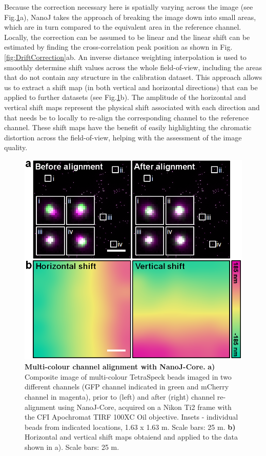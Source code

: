  Because the correction necessary here is spatially varying across the image (see Fig.\ref{fig:ChannelAlignment}a), NanoJ takes the approach of breaking the image down into small areas, which are in turn compared to the equivalent area in the reference channel. Locally, the correction can be assumed to be linear and the linear shift can be estimated by finding the cross-correlation peak position as shown in Fig.\ref{fig:DriftCorrection}ab. An inverse distance weighting interpolation \cite{shepard1968two} is used to smoothly determine shift values across the whole field-of-view, including the areas that do not contain any structure in the calibration dataset. This approach allows us to extract a shift map (in both vertical and horizontal directions) that can be applied to further datasets (see Fig.\ref{fig:ChannelAlignment}b). The amplitude of the horizontal and vertical shift maps represent the physical shift associated with each direction and that needs be to locally to re-align the corresponding channel to the reference channel. These shift maps have the benefit of easily highlighting the chromatic distortion across the field-of-view, helping with the assessment of the image quality. 
 
 \begin{figure}[!t]
    \centering
    \includegraphics[width=\linewidth]{Figures/Test_Figure_3.png}
    \caption{\textbf{Multi-colour channel alignment with NanoJ-Core.} \textbf{a)} Composite image of multi-colour TetraSpeck beads imaged in two different channels (GFP channel indicated in green and mCherry channel in magenta), prior to (left) and after (right) channel re-alignment using NanoJ-Core, acquired on a Nikon Ti2 frame with the CFI Apochromat TIRF 100XC Oil objective. Insets - individual beads from indicated locations, 1.63 x 1.63 \micro m. Scale bars: 25 \micro m. \textbf{b)} Horizontal and vertical shift maps obtaiend and applied to the data shown in a). Scale bars: 25 \micro m.}
    \label{fig:ChannelAlignment}
\end{figure}
 
